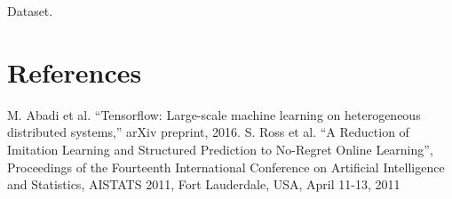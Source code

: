 \documentclass[conference]{IEEEtran}
\begin{document}
\begin{video}[!t]
	\caption{Dataset.}
	\label{vid:dataset}
\end{video}
\section*{References}

\begin{thebibliography}{00}
	
 M. Abadi et al. ``Tensorflow: Large-scale machine learning on heterogeneous distributed systems,'' arXiv preprint, 2016.
 S. Ross et al. ``A Reduction of Imitation Learning and Structured Prediction to No-Regret Online Learning'', Proceedings of the Fourteenth International Conference on Artificial Intelligence and Statistics, {AISTATS} 2011, Fort Lauderdale, USA, April 11-13, 2011
\end{thebibliography}
\end{document}
